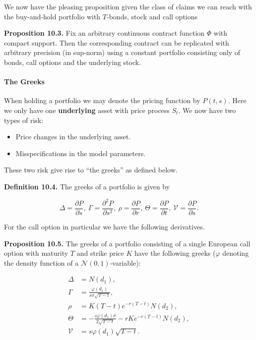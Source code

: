\documentclass[
]{article}
\providecommand{\tightlist}{%
  \setlength{\itemsep}{0pt}\setlength{\parskip}{0pt}}
\begin{document}
We now have the pleasing proposition given the class of claims we can
reach with the buy-and-hold portfolio with \(T\)-bonds, stock and call
options

\textbf{Proposition 10.3.} Fix an arbitrary continuous contract function
\(\Phi\) with compact support. Then the corresponding contract can be
replicated with arbitrary precision (in sup-norm) using a constant
portfolio consisting only of bonds, call options and the underlying
stock.

\hypertarget{the-greeks}{%
\paragraph{The Greeks}\label{the-greeks}}

When holding a portfolio we may denote the pricing function by
\(P(t,s)\). Here we only have one \textbf{underlying} asset with price
process \(S_t\). We now have two types of risk:

\begin{itemize}
\tightlist
\item
  Price changes in the underlying asset.
\item
  Misspecifications in the model parameters.
\end{itemize}

These two risk give rise to ``the greeks'' as defined below.

\textbf{Definition 10.4.} The greeks of a portfolio is given by

\[
\Delta=\frac{\partial P}{\partial s},\ \Gamma=\frac{\partial^2 P}{\partial s^2},\ \rho=\frac{\partial P}{\partial r},\ \Theta=\frac{\partial P}{\partial t},\ \mathcal{V}=\frac{\partial P}{\partial s}.
\]

For the call option in particular we have the following derivatives.

\textbf{Proposition 10.5.} The greeks of a portfolio consisting of a
single European call option with maturity \(T\) and strike price \(K\)
have the following greeks (\(\varphi\) denoting the density function of
a \(\mathcal{N}(0,1)\)-variable):

\begin{align*}
\Delta&=N(d_1),\\
\Gamma&=\frac{\varphi(d_1)}{s\sigma\sqrt{T-t}},\\
\rho&=K(T-t)e^{-r(T-t)}N(d_2),\\
\Theta&=-\frac{s\varphi(d_1)\sigma}{2\sqrt{T-t}}-rKe^{-r(T-t)}N(d_2),\\
\mathcal{V}&=s\varphi(d_1)\sqrt{T-t}.
\end{align*}
\end{document}
